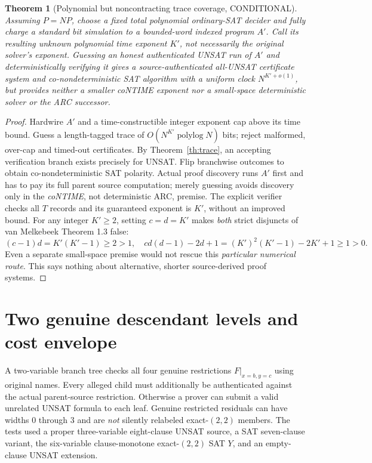\documentclass[11pt]{article}
\newtheorem{theorem}{Theorem}
\begin{document}
\begin{theorem}[Polynomial but noncontracting trace coverage, CONDITIONAL]\label{th:cap}
Assuming $P=NP$, choose a fixed total polynomial ordinary-SAT decider and fully charge a standard bit simulation to a bounded-word indexed program $A'$. Call its resulting \emph{unknown} polynomial time exponent $K'$, not necessarily the original solver's exponent. Guessing an honest authenticated UNSAT run of $A'$ and deterministically verifying it gives a source-authenticated all-UNSAT certificate system and co-nondeterministic SAT algorithm with a \emph{uniform} clock $N^{K'+o(1)}$, but provides neither a smaller coNTIME exponent nor a small-space deterministic solver or the ARC successor.
\end{theorem}
\begin{proof}
Hardwire $A'$ and a time-constructible integer exponent cap above its time bound. Guess a length-tagged trace of $O(N^{K'}\operatorname{polylog}N)$ bits; reject malformed, over-cap and timed-out certificates. By Theorem~\ref{th:trace}, an accepting verification branch exists precisely for UNSAT. Flip branchwise outcomes to obtain co-nondeterministic SAT polarity. Actual proof discovery runs $A'$ first and has to pay its full parent source computation; merely guessing avoids discovery only in the \emph{coNTIME}, not deterministic ARC, premise. The explicit verifier checks all $T$ records and its guaranteed exponent is $K'$, without an improved bound. For any integer $K'\ge2$, setting $c=d=K'$ makes \emph{both} strict disjuncts of van Melkebeek Theorem 1.3 false:
\[
(c-1)d=K'(K'-1)\ge2>1,\quad
cd(d-1)-2d+1=(K')^2(K'-1)-2K'+1\ge1>0.
\]
Even a separate small-space premise would not rescue this \emph{particular numerical route}. This says nothing about alternative, shorter source-derived proof systems.
\end{proof}

\section{Two genuine descendant levels and cost envelope}
A two-variable branch tree checks all four genuine restrictions $F|_{x=b,y=c}$ using original names. Every alleged child must additionally be authenticated against the actual parent-source restriction. Otherwise a prover can submit a valid unrelated UNSAT formula to each leaf. Genuine restricted residuals can have widths $0$ through $3$ and are \emph{not} silently relabeled exact-$(2,2)$ members. The tests used a proper three-variable eight-clause UNSAT source, a SAT seven-clause variant, the six-variable clause-monotone exact-$(2,2)$ SAT $Y$, and an empty-clause UNSAT extension.
\end{document}
